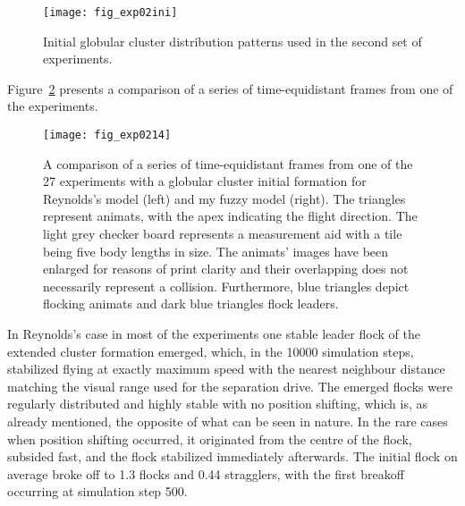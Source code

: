 \begin{figure}
	\texttt{[image: fig\_exp02ini]}
	\caption{Initial globular cluster distribution patterns used in the second set of experiments.}
	\label{fig:exp:02:ini}
\end{figure}

Figure~\ref{fig:exp:02:14} presents a comparison of a series of time-equidistant frames from one of the experiments. 
%
\begin{figure}[!ht]
	\null\vspace*{1mm}
	\texttt{[image: fig\_exp0214]}
	\par\vspace*{1mm}
	\caption{A comparison of a series of time-equidistant frames from one of the 27 experiments with a globular cluster initial formation for Reynolds's model \cite{reynolds:1999} (left) and my fuzzy model (right). The triangles represent animats, with the apex indicating the flight direction. The light grey checker board represents a measurement aid with a tile being five body lengths in size. The animats' images have been enlarged for reasons of print clarity and their overlapping does not necessarily represent a collision. Furthermore, blue triangles depict flocking animats and dark blue triangles flock leaders.}
	\label{fig:exp:02:14}
\end{figure}
%
In Reynolds's case in most of the experiments one stable leader flock of the extended cluster formation emerged, which, in the 10000 simulation steps, stabilized flying at exactly maximum speed with the nearest neighbour distance matching the visual range used for the separation drive. The emerged flocks were regularly distributed and highly stable with no position shifting, which is, as already mentioned, the opposite of what can be seen in nature. In the rare cases when position shifting occurred, it originated from the centre of the flock, subsided fast, and the flock stabilized immediately afterwards. The initial flock on average broke off to 1.3 flocks and 0.44 stragglers, with the first breakoff occurring at simulation step 500. 

